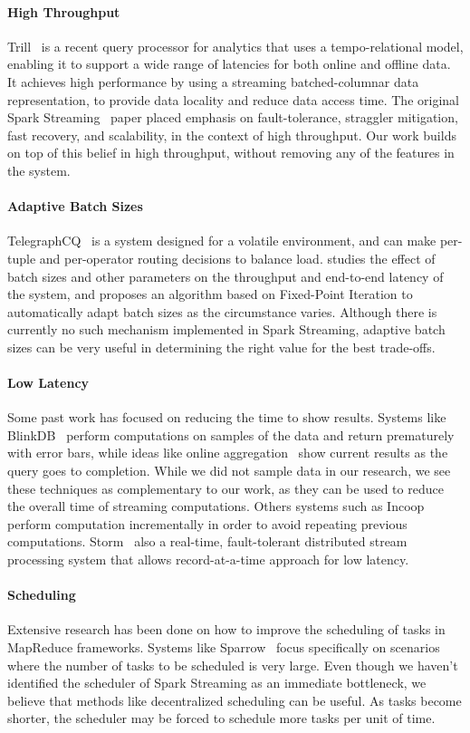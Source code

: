 \paragraph {\bf High Throughput} Trill~\cite{Trill} is a recent query processor for analytics that uses a tempo-relational model, enabling it to support a wide range of latencies for both online and offline data. It achieves high performance by using a streaming batched-columnar data representation, to provide data locality and reduce data access time.
The original Spark Streaming~\cite{SparkStreaming} paper placed emphasis on fault-tolerance, straggler mitigation, fast recovery, and scalability, in the context of high throughput. Our work builds on top of this belief in high throughput, without removing any of the features in the system.

\paragraph {\bf Adaptive Batch Sizes} TelegraphCQ~\cite{TelegraphCQ} is a system designed for a volatile environment, and can make per-tuple and per-operator routing decisions to balance load. \cite{das2014adaptive} studies the effect of batch sizes and other parameters on the throughput and end-to-end latency of the system, and proposes an algorithm based on Fixed-Point Iteration to automatically adapt batch sizes as the circumstance varies. Although there is currently no such mechanism implemented in Spark Streaming, adaptive batch sizes can be very useful in determining the right value for the best trade-offs.

\paragraph {\bf Low Latency} Some past work has focused on reducing the time to show results. Systems like BlinkDB~\cite{BlinkDB} perform computations on samples of the data and return prematurely with error bars, while ideas like online aggregation~\cite{OnlineAggregation} show current results as the query goes to completion.
While we did not sample data in our research, we see these techniques as complementary to our work, as they can be used to reduce the overall time of streaming computations.
Others systems such as Incoop~\cite{Incoop} perform computation incrementally in order to avoid repeating previous computations. Storm~\cite{Storm} also a real-time, fault-tolerant distributed stream processing system that allows record-at-a-time approach for low latency.

\paragraph {\bf Scheduling} Extensive research has been done on how to improve the scheduling of tasks in MapReduce frameworks. 
Systems like Sparrow~\cite{Sparrow} focus specifically on scenarios where the number of tasks to be scheduled is very large.
Even though we haven't identified the scheduler of Spark Streaming as an immediate bottleneck, we believe that methods like decentralized scheduling can be useful. As tasks become shorter, the scheduler may be forced to schedule more tasks per unit of time. 
